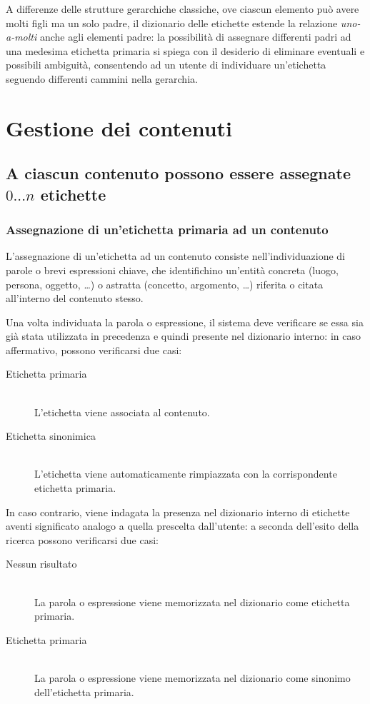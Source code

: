 \documentclass[10pt,a4paper,headinclude,footinclude,hidelinks]{scrreprt} %
\begin{document}
	A differenze delle strutture gerarchiche classiche, ove ciascun elemento può avere molti figli ma un solo padre, il dizionario delle etichette estende la relazione \textit{uno-a-molti} anche agli elementi padre: la possibilità di assegnare differenti padri ad una medesima etichetta primaria si spiega con il desiderio di eliminare eventuali e possibili ambiguità, consentendo ad un utente di individuare un'etichetta seguendo differenti cammini nella gerarchia.

	\section{Gestione dei contenuti} %
	
	\subsection[Assegnazione etichette]{A ciascun contenuto possono essere assegnate $0...n$ etichette}
	\subsubsection{Assegnazione di un'etichetta primaria ad un contenuto}
	L'assegnazione di un'etichetta ad un contenuto consiste nell'individuazione di parole o brevi espressioni chiave, che identifichino un'entità concreta (luogo, persona, oggetto, \ldots) o astratta (concetto, argomento, \ldots) riferita o citata all'interno del contenuto stesso.
	
	Una volta individuata la parola o espressione, il sistema deve verificare se essa sia già stata utilizzata in precedenza e quindi presente nel dizionario interno: in caso affermativo, possono verificarsi due casi:
	\begin{description}
	\item[Etichetta primaria] \hfill \\
	L'etichetta viene associata al contenuto.
	\item[Etichetta sinonimica] \hfill \\
	L'etichetta viene automaticamente rimpiazzata con la corrispondente etichetta primaria.
	\end{description}

	In caso contrario, viene indagata la presenza nel dizionario interno di etichette aventi significato analogo a quella prescelta dall'utente: a seconda dell'esito della ricerca possono verificarsi due casi:
	\begin{description}
	\item[Nessun risultato] \hfill \\
	La parola o espressione viene memorizzata nel dizionario come etichetta primaria.
	\item[Etichetta primaria] \hfill \\
	La parola o espressione viene memorizzata nel dizionario come sinonimo dell'etichetta primaria.
	\end{description}
\end{document}
